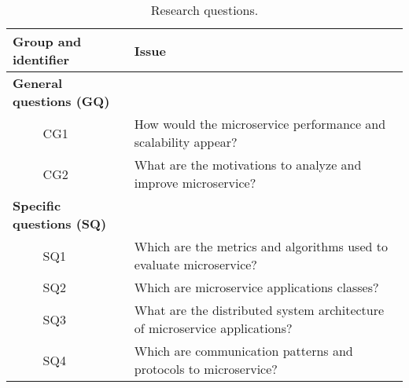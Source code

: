 \begin{table*}[htbp]
\centering
\renewcommand{\arraystretch}{1.5}
\caption{Research questions.}
\label{table_questions}
\begin{tabularx}{\textwidth}{ll@{\hspace{8em}}l}
\hline
\multicolumn{2}{l}{Group and identifier} & Issue \\ \hline
\multicolumn{2}{l}{\textbf{General questions (GQ)}} &  \\
 & CG1 & How would the microservice performance and scalability appear? \\
 & CG2 & What are the motivations to analyze and improve microservice? \\
\multicolumn{2}{l}{\textbf{Specific questions (SQ)}} &  \\
 & SQ1 & Which are the metrics and algorithms used to evaluate microservice? \\
 & SQ2 & Which are microservice applications classes? \\
 & SQ3 & What are the distributed system architecture of microservice applications? \\
 & SQ4 & Which are communication patterns and protocols to microservice? \\ \hline
\end{tabularx}
\end{table*}